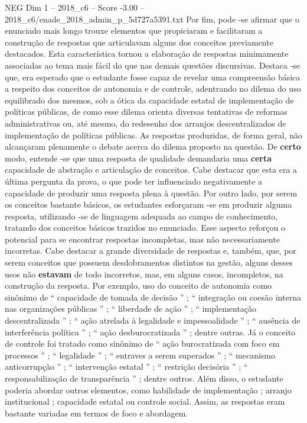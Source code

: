 \begin{textsample}{NEG Dim 1 – 2018\_c6 – Score -3.00 – 2018\_c6/enade\_2018\_admin\_p\_5d727a5391.txt}
Por fim, pode -se afirmar que o enunciado mais longo trouxe elementos que propiciaram e facilitaram a construção de respostas que articulavam alguns dos conceitos previamente destacados.
Esta característica tornou a elaboração de respostas minimamente associadas ao tema mais fácil do que nas demais questões discursivas.
Destaca -se que, era esperado que o estudante fosse capaz de revelar uma compreensão básica a respeito dos conceitos de autonomia e de controle, adentrando no dilema do uso equilibrado dos mesmos, sob a ótica da capacidade estatal de implementação de políticas públicas, de como esse dilema orienta diversas tentativas de reformas administrativas ou, até mesmo, do redesenho dos arranjos descentralizados de implementação de políticas públicas.
As respostas produzidas, de forma geral, não alcançaram plenamente o debate acerca do dilema proposto na questão.
De \textbf{certo} modo, entende -se que uma resposta de qualidade demandaria uma \textbf{certa} capacidade de abstração e articulação de conceitos.
Cabe destacar que esta era a última pergunta da prova, o que pode ter influenciado negativamente a capacidade de produzir uma resposta plena à questão.
Por outro lado, por serem os conceitos bastante básicos, os estudantes esforçaram -se em produzir alguma resposta, utilizando -se de linguagem adequada ao campo de conhecimento, tratando dos conceitos básicos trazidos no enunciado.
Esse aspecto reforçou o potencial para se encontrar respostas incompletas, mas não necessariamente incorretas.
Cabe destacar a grande diversidade de respostas e, também, que, por serem conceitos que possuem desdobramentos distintos na gestão, alguns desses usos não \textbf{estavam} de todo incorretos, mas, em alguns casos, incompletos, na construção da resposta.
Por exemplo, uso do conceito de autonomia como sinônimo de “ capacidade de tomada de decisão ” ; “ integração ou coesão interna nas organizações públicas ” ; “ liberdade de ação ” ; “ implementação descentralizada ” ; “ ação atrelada à legalidade e impessoalidade ” ; “ ausência de interferência política ” ; “ ação desburocratizada ” ; dentre outras.
Já o conceito de controle foi tratado como sinônimo de “ ação burocratizada com foco em processos ” ; “ legalidade ” ; “ entraves a serem superados ” ; “ mecanismo anticorrupção ” ; “ intervenção estatal ” ; “ restrição decisória ” ; “ responsabilização de transparência ” ; dentre outros.
Além disso, o estudante poderia abordar outros elementos, como habilidade de implementação ; arranjo institucional ; capacidade estatal ou controle social.
Assim, as respostas eram bastante variadas em termos de foco e abordagem.

\end{textsample}
